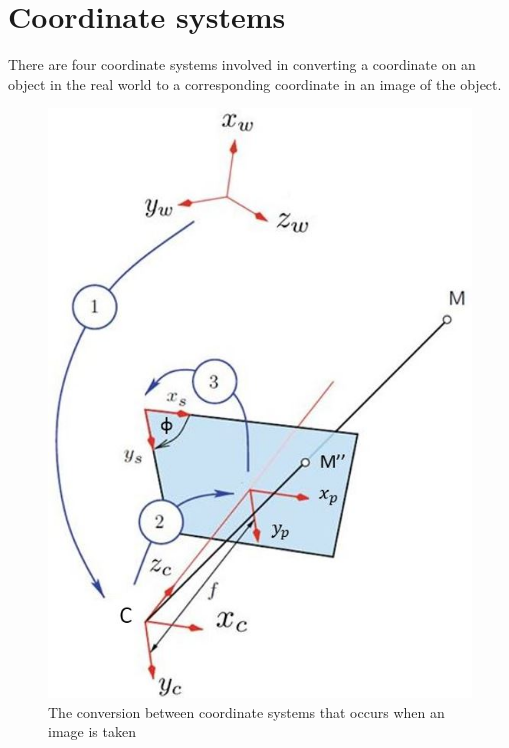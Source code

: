 \documentclass[12pt,oneside,openany,a4paper, %
english, %
masters-t, goldenblock]{usthesis}
\begin{document}

\section{Coordinate systems}
There are four coordinate systems involved in converting a coordinate on an object in the real world to a corresponding coordinate in an image of the object. 

\begin{figure}[H]
    \centering
    \includegraphics[scale=0.5]{CoordinateSystems}
    \caption{The conversion between coordinate systems that occurs when an image is taken \cite{sutton2009image}}
    \label{fig:coordsys}
\end{figure}
\end{document}
